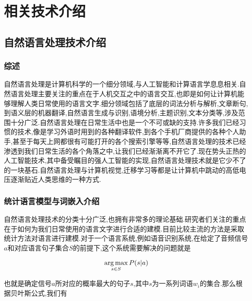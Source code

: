 

\chapter{相关技术介绍}
\label{chap:archi-preli}

\section{自然语言处理技术介绍}
\label{sec:nlp}

\subsection{综述}

自然语言处理是计算机科学的一个细分领域,与人工智能和计算语言学息息相关.自然语言处理主要关注的重点在于人机交互之中的语言交互,也即是如何让计算机能够理解人类日常使用的语言文字.细分领域包括了底层的词法分析与解析,文章断句,到语义层的机器翻译,自然语言生成与识别,语境分析,主题识别,文本分类等,涉及范围十分广泛.自然语言处理在日常生活中也是一个不可或缺的支持.许多我们已经习惯的技术,像是学习外语时用到的各种翻译软件,到各个手机厂商提供的各种个人助手,甚至于每天上网都很有可能打开的各个搜索引擎等等,自然语言处理的技术已经渗透到我们日常生活的各个角落之中,让我们已经渐渐离不开它了.现在势头正热的人工智能技术,其中备受瞩目的强人工智能的实现,自然语言处理技术就是它少不了的一块基石.自然语言处理与计算机视觉,迁移学习等都是让计算机中跳动的高低电压逐渐贴近人类思维的一种方式.

\subsection{统计语言模型与词嵌入介绍}

自然语言处理技术的分类十分广泛,也拥有非常多的理论基础.研究者们关注的重点在于如何为我们日常使用的语言文字进行合适的建模.目前比较主流的方法是采取统计方法对语言进行建模\cite{邢永康2003统计语言模型综述}.对于一个语言系统,例如语音识别系统,在给定了音频信号$a$和对应语言句子集合$S$的前提下,这个系统需要解决的问题就是

\begin{equation}
	\operatorname*{arg\,max}_{s \in S}P(s|a)
\end{equation}

也就是确定信号$a$所对应的概率最大的句子$s$,其中$s$为一系列词语$w_{i}$的集合.那么根据贝叶斯公式,我们有

